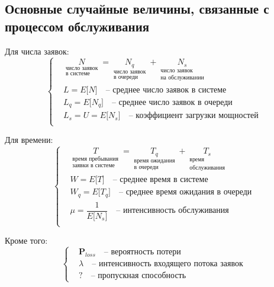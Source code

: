 \documentclass{article}
\begin{document}
\subsection*{Основные случайные величины, связанные с процессом обслуживания}
Для числа заявок:
\begin{equation*}
\left\{
\begin{aligned}
& \underset{\substack{\text{число заявок} \\ \text{в системе}}}{N} \! = \! \underset{\substack{\text{число заявок} \\ \text{в очереди}}}{N_q} \! + \! \underset{\substack{\text{число заявок} \\ \text{на обслуживании}}}{N_s} \\
& L \! = \! E \big[ N \big] \quad \text{-- среднее число заявок в системе} \\
& L_q \! = \! E \big[ N_q \big] \quad \text{-- среднее число заявок в очереди} \\
& L_s \! = \! U \! = \! E \big[ N_s \big] \quad \text{-- коэффициент загрузки мощностей} \\
\end{aligned}
\right.
\end{equation*}\par
Для времени:
\begin{equation*}
\left\{
\begin{aligned}
& \underset{\substack{\text{время пребывания} \\ \text{заявки в системе}}}{T} \! = \! \underset{\substack{\text{время ожидания} \\ \text{в очереди}}}{T_q} \! + \! \underset{\substack{\text{время} \\ \text{обслуживания}}}{T_s} \\
& W \! = \! E \big[ T \big] \quad \text{-- среднее время в системе} \\
& W_q \! = \! E \big[ T_q \big] \quad \text{-- среднее время ожидания в очереди} \\
& \mu \! = \! \dfrac{1}{E \big[ N_s \big]} \quad \text{-- интенсивность обслуживания} \\
\end{aligned}
\right.
\end{equation*}\par
Кроме того:
\begin{equation*}
\left\{
\begin{aligned}
& \mathbf{P}_{loss} \quad \text{-- вероятность потери} \\
& \lambda \quad \text{-- интенсивность входящего потока заявок} \\
& ? \quad \text{-- пропускная способность}
\end{aligned}
\right.
\end{equation*}\par
\end{document}
